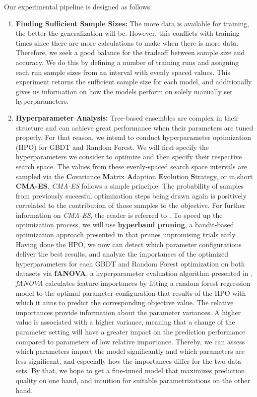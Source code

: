Our experimental pipeline is designed as follows:
\begin{enumerate}
	\item \textbf{Finding Sufficient Sample Sizes:} The more data is available for training, the better the generalization will be. However, this conflicts with training times since there are more calculations to make when there is more data. Therefore, we seek a good balance for the tradeoff between sample size and accuracy. We do this by defining a number of training runs and assigning each run sample sizes from an interval with evenly spaced values. This experiment returns the sufficient sample size for each model, and additionally gives us information on how the models perform on solely manually set hyperparameters.  
	\item \textbf{Hyperparameter Analysis:} Tree-based ensembles are complex in their structure and can achieve great performance when their parameters are tuned properly. For that reason, we intend to conduct hyperparameter optimization (HPO) for GBDT and Random Forest. We will first specify the hyperparameters we consider to optimize and then specify their respective search space. The values from these evenly-spaced search space intervals are sampled via the \textbf{C}ovariance \textbf{M}atrix \textbf{A}daption \textbf{E}volution \textbf{S}trategy, or in short \textbf{CMA-ES}. \textit{CMA-ES} follows a simple principle: The probability of samples from previously succesful optimization steps being drawn again is positively correlated to the contribution of those samples to the objective. For further information on \textit{CMA-ES}, the reader is referred to \cite{hansen2016cma}. To speed up the optimization process, we will use \textbf{hyperband pruning}, a bandit-based optimization approach presented in \cite{li2018hyperband} that prunes unpromising trials early. 
	Having done the HPO, we now can detect which parameter configurations deliver the best results, and analyze the importances of the optimized hyperparameters for each GBDT and Random Forest optimization on both datasets via \textbf{fANOVA}, a hyperparameter evaluation algorithm presented in \cite{fANOVA}. \textit{fANOVA} calculates feature importances by fitting a random forest regression model to the optimal parameter configuration that results of the HPO with which it aims to predict the corresponding objective value. The relative importances provide information about the parameter variances. A higher value is associated with a higher variance, meaning that a change of the parameter setting will have a greater impact on the prediction performance compared to parameters of low relative importance. Thereby, we can assess which parameters impact the model significantly and which parameters are less significant, and especially how the importances differ for the two data sets. By that, we hope to get a fine-tuned model that maximizes prediction quality on one hand, and intuition for suitable parametrizations on the other hand.

\end{enumerate}
